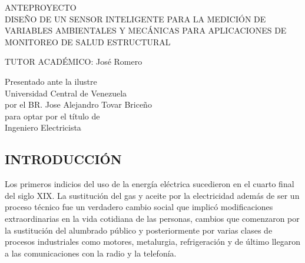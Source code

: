 \documentclass[12pt,letterpaper]{article}
\author{} %
\date{FECHA} %
\begin{document}
	
	\renewcommand{\listfigurename}{Lista de Figuras}
	\renewcommand{\listtablename}{Lista de Tablas}
	\renewcommand{\contentsname}{Lista de Contenidos}
	\renewcommand{\figurename}{Figura}
	\renewcommand{\tablename}{Tabla}

	
\begin{center}

\vspace{3cm} ANTEPROYECTO \\

\vspace{8cm} DISEÑO DE UN SENSOR INTELIGENTE PARA LA MEDICIÓN DE VARIABLES AMBIENTALES Y MECÁNICAS PARA APLICACIONES DE MONITOREO DE SALUD ESTRUCTURAL
\end{center}


\vspace{6cm}

\begin{flushleft}
	TUTOR ACADÉMICO: José Romero \\
	
\end{flushleft}

	
\begin{flushright}
	
	
		Presentado ante la ilustre\\
		Universidad Central de Venezuela\\
		por el BR. Jose Alejandro Tovar Briceño \\
		para optar por el título de \\
		Ingeniero Electricista   \\
	


\end{flushright}


\vspace{2cm}
\thispagestyle{empty}
\newpage


\begin{center}
	\section*{ INTRODUCCIÓN}
\end{center}



Los primeros indicios del uso de la energía eléctrica sucedieron en el cuarto final del siglo XIX. La sustitución del gas y aceite por la electricidad además de ser un proceso técnico fue un verdadero cambio social que implicó modificaciones extraordinarias en la vida cotidiana de las personas, cambios que comenzaron por la sustitución del alumbrado público y posteriormente por varias clases de procesos industriales como motores, metalurgia, refrigeración y de último llegaron a las comunicaciones con la radio y la telefonía.\\
\end{document}
